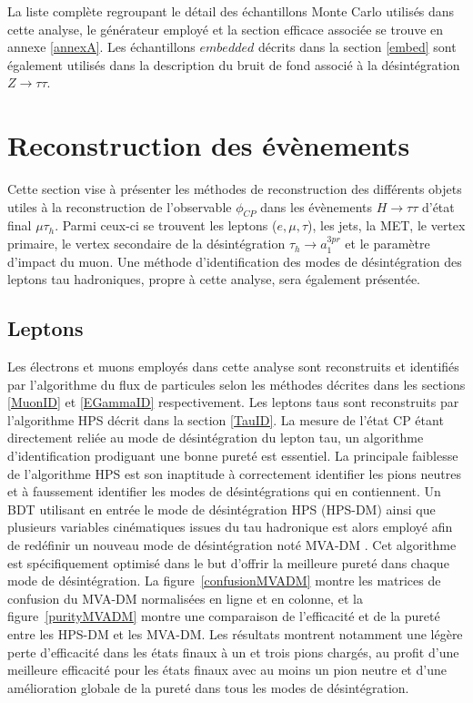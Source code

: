 La liste complète regroupant le détail des échantillons Monte Carlo utilisés dans cette analyse, le générateur employé et la section efficace associée se trouve en annexe \ref{annexA}. Les échantillons $\textit{embedded}$ décrits dans la section \ref{embed} sont également utilisés dans la description du bruit de fond associé à la désintégration $Z\rightarrow\tau\tau$.



\section{Reconstruction des évènements}
\label{eventreco}

Cette section vise à présenter les méthodes de reconstruction des différents objets utiles à la reconstruction de l'observable $\phi_{CP}$ dans les évènements $H\to\tau\tau$ d'état final $\mu\tau_h$. Parmi ceux-ci se trouvent les leptons ($e,\mu,\tau$), les jets, la MET, le vertex primaire, le vertex secondaire de la désintégration $\tau_h\to a_1^{3pr}$ et le paramètre d'impact du muon. Une méthode d'identification des modes de désintégration des leptons tau hadroniques, propre à cette analyse, sera également présentée. 

\subsection{Leptons}

Les électrons et muons employés dans cette analyse sont reconstruits et identifiés par l'algorithme du flux de particules selon les méthodes décrites dans les sections \ref{MuonID} et \ref{EGammaID} respectivement. Les leptons taus sont reconstruits par l'algorithme HPS décrit dans la section \ref{TauID}. La mesure de l'état CP étant directement reliée au mode de désintégration du lepton tau, un algorithme d'identification prodiguant une bonne pureté est essentiel. La principale faiblesse de l'algorithme HPS est son inaptitude à correctement identifier les pions neutres et à faussement identifier les modes de désintégrations qui en contiennent. Un BDT utilisant en entrée le mode de désintégration HPS (HPS-DM) ainsi que plusieurs variables cinématiques issues du tau hadronique est alors employé afin de redéfinir un nouveau mode de désintégration noté MVA-DM \cite{mohammadphd,mvadm}. Cet algorithme est spécifiquement optimisé dans le but d'offrir la meilleure pureté dans chaque mode de désintégration. La figure~\ref{confusionMVADM} montre les matrices de confusion du MVA-DM normalisées en ligne et en colonne, et la figure~\ref{purityMVADM} montre une comparaison de l'efficacité et de la pureté entre les HPS-DM et les MVA-DM. Les résultats montrent notamment une légère perte d'efficacité dans les états finaux à un et trois pions chargés, au profit d'une meilleure efficacité pour les états finaux avec au moins un pion neutre et d'une amélioration globale de la pureté dans tous les modes de désintégration. \\

